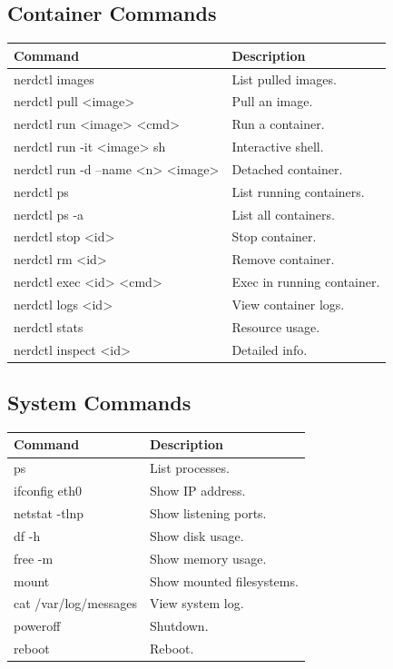 \subsection{Container Commands}
\begin{longtable}{|p{5cm}|p{8cm}|}
\hline
\textbf{Command} & \textbf{Description} \\
\hline
nerdctl images & List pulled images. \\
nerdctl pull <image> & Pull an image. \\
nerdctl run <image> <cmd> & Run a container. \\
nerdctl run -it <image> sh & Interactive shell. \\
nerdctl run -d --name <n> <image> & Detached container. \\
nerdctl ps & List running containers. \\
nerdctl ps -a & List all containers. \\
nerdctl stop <id> & Stop container. \\
nerdctl rm <id> & Remove container. \\
nerdctl exec <id> <cmd> & Exec in running container. \\
nerdctl logs <id> & View container logs. \\
nerdctl stats & Resource usage. \\
nerdctl inspect <id> & Detailed info. \\
\hline
\end{longtable}

\subsection{System Commands}
\begin{longtable}{|p{5cm}|p{8cm}|}
\hline
\textbf{Command} & \textbf{Description} \\
\hline
ps & List processes. \\
ifconfig eth0 & Show IP address. \\
netstat -tlnp & Show listening ports. \\
df -h & Show disk usage. \\
free -m & Show memory usage. \\
mount & Show mounted filesystems. \\
cat /var/log/messages & View system log. \\
poweroff & Shutdown. \\
reboot & Reboot. \\
\hline
\end{longtable}

